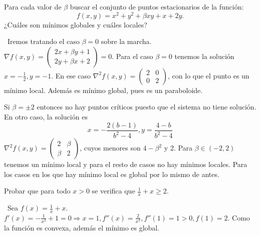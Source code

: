 \documentclass[twoside]{article}
\begin{document}
\newpage 

\begin{ejercicio}{5}

Para cada valor de $\beta$ buscar el conjunto de puntos estacionarios de la función: $$f(x,y)=x^2+y^2+\beta xy+x+2y.$$
¿Cuáles son mínimos globales y cuáles locales?
\begin{solucion}\
Iremos tratando el caso $\beta=0$ sobre la marcha. $\nabla f(x,y)=\begin{pmatrix}
2x+\beta y +1\\
2y+\beta x+2
\end{pmatrix}=0$. Para el caso $\beta=0$ tenemos la solución $x=-\frac{1}{2},y=-1$. En ese caso $\nabla^2 f(x,y)=\begin{pmatrix}
2 & 0\\
0 & 2
\end{pmatrix}$, con lo que el punto es un mínimo local.  Además es mínimo global, pues es un paraboloide.

Si $\beta=\pm 2$ entonces no hay puntos críticos puesto que el sistema no tiene solución. En otro caso, la solución es 
$$x=-\frac{2(b-1)}{b^2-4}, y=\frac{4-b}{b^2-4}$$
$\nabla^2 f(x,y)=\begin{pmatrix}
2 & \beta\\
\beta & 2
\end{pmatrix}$, cuyos menores son $4-\beta^2$ y $2$. Para $\beta\in (-2,2)$ tenemos un mínimo local y para el resto de casos no hay mínimos locales. Para los casos en los que hay mínimo local es global por lo mismo de antes. 
\end{solucion}
\end{ejercicio}

\newpage 

\begin{ejercicio}{6}
Probar que para todo $x>0$ se verifica que $\frac{1}{x}+x\geq 2$.

\begin{solucion}\
Sea $f(x)=\frac{1}{x}+x$. $f'(x)=-\frac{1}{x^2}+1=0\Rightarrow x=1, f''(x)=\frac{2}{x^3},f''(1)=1>0, f(1)=2$. Como la función es convexa, además el mínimo es global.
\end{solucion}
\end{ejercicio}

\newpage 
\end{document}
